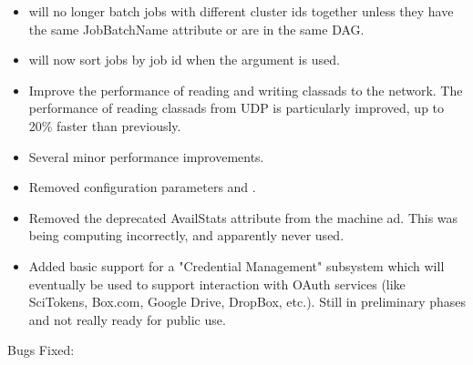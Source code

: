 \begin{itemize}
\item {} will no longer batch jobs with different cluster ids together unless they
have the same JobBatchName attribute or are in the same DAG.

\item {} will now sort jobs by job id when the  argument is used.

\item Improve the performance of reading and writing classads to the network.
The performance of reading classads from UDP is particularly improved, up
to 20\% faster than previously.

\item Several minor performance improvements.

\item Removed configuration parameters 
and .

\item Removed the deprecated AvailStats attribute from the machine ad. This
was being computing incorrectly, and apparently never used.

\item Added basic support for a "Credential Management" subsystem which will
eventually be used to support interaction with OAuth services (like SciTokens,
Box.com, Google Drive, DropBox, etc.).  Still in preliminary phases and not
really ready for public use.

\end{itemize}

\noindent Bugs Fixed:

